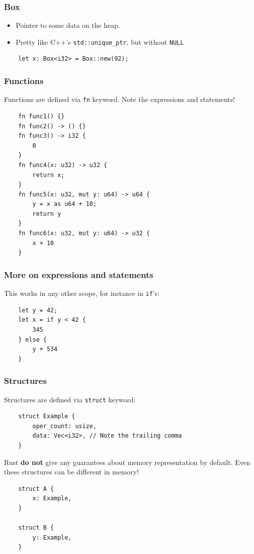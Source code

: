 \documentclass[aspectratio=1610,t]{beamer}
\begin{document}
\begin{frame}[fragile]
\frametitle{Box}
\begin{itemize}
    \item Pointer to some data on the heap.
    \item Pretty like C++'s \texttt{std::unique\_ptr}, but without \texttt{NULL}
\end{itemize}

\begin{verbatim}
    let x: Box<i32> = Box::new(92);
\end{verbatim}
\end{frame}


\begin{frame}[fragile]
\frametitle{Functions}
Functions are defined via \texttt{fn} keyword. Note the expressions and statements!

\begin{verbatim}
    fn func1() {}
    fn func2() -> () {}
    fn func3() -> i32 {
        0
    }
    fn func4(x: u32) -> u32 {
        return x;
    }
    fn func5(x: u32, mut y: u64) -> u64 {
        y = x as u64 + 10;
        return y
    }
    fn func6(x: u32, mut y: u64) -> u32 {
        x + 10
    }
\end{verbatim}
\end{frame}


\begin{frame}[fragile]
\frametitle{More on expressions and statements}
This works in any other scope, for instance in \texttt{if}'s:

\begin{verbatim}
    let y = 42;
    let x = if y < 42 {
        345
    } else {
        y + 534
    }
\end{verbatim}
\end{frame}


\begin{frame}[fragile]
\frametitle{Structures}
Structures are defined via \texttt{struct} keyword:

\begin{verbatim}
    struct Example {
        oper_count: usize,
        data: Vec<i32>, // Note the trailing comma
    }
\end{verbatim}

Rust \textbf{do not} give any guarantees about memory representation by default. Even these structures can be different in memory!

\begin{verbatim}
    struct A {
        x: Example,
    }

    struct B {
        y: Example,
    }
\end{verbatim}
\end{frame}
\end{document}
